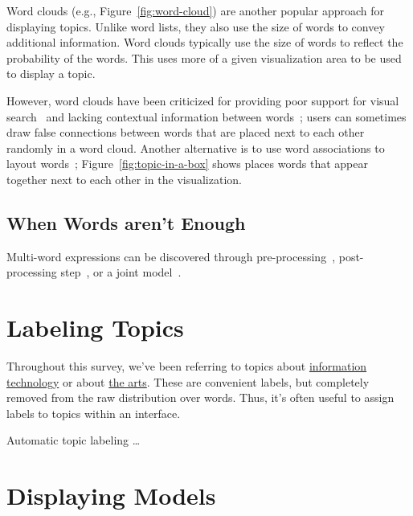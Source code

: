 Word clouds (e.g., Figure~\ref{fig:word-cloud}) are another popular approach for
displaying topics.  Unlike word lists, they also use the size of words to convey
additional information. Word clouds typically use the size of words to reflect
the probability of the words.  This uses more of a given visualization area to
be used to display a topic.

However, word clouds have been criticized for providing poor support for visual
search~\cite{Viegas2008} and lacking contextual information between
words~\cite{harris11}; users can sometimes draw false connections between words
that are placed next to each other randomly in a word cloud.  Another
alternative is to use word associations to layout
words~\citep{Smith:Chuang:Hu:Boyd-Graber:Findlater-2014};
Figure~\ref{fig:topic-in-a-box} shows places words that appear together next to
each other in the visualization.

\subsection{When Words aren't Enough}

Multi-word expressions can be discovered through
pre-processing~\citep{talley-11}, post-processing step~\citep{blei-09b},
or a joint model~\citep{johnson-10}.

\section{Labeling Topics}

Throughout this survey, we've been referring to topics about
\underline{information technology} or about \underline{the arts}.  These are
convenient labels, but completely removed from the raw distribution over words.
Thus, it's often useful to assign labels to topics within an interface.


Automatic topic labeling \dots

\section{Displaying Models}

